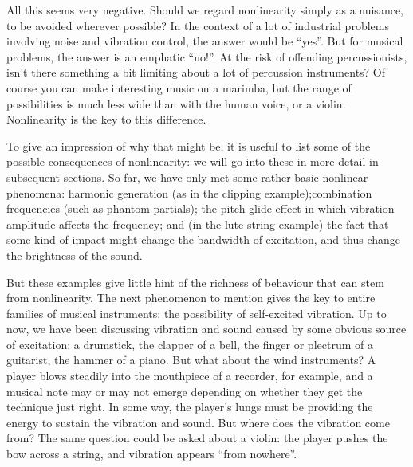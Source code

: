   All this seems very negative. Should we regard nonlinearity simply as a 
  nuisance, to be avoided wherever possible? In the context of a lot of 
  industrial problems involving noise and vibration control, the answer would 
  be “yes”. But for musical problems, the answer is an emphatic “no!”. At the 
  risk of offending percussionists, isn’t there something a bit limiting about 
  a lot of percussion instruments? Of course you can make interesting music on 
  a marimba, but the range of possibilities is much less wide than with the 
  human voice, or a violin. Nonlinearity is the key to this difference. 

  To give an impression of why that might be, it is useful to list some of the 
  possible consequences of nonlinearity: we will go into these in more detail 
  in subsequent sections. So far, we have only met some rather basic nonlinear 
  phenomena: harmonic generation (as in the clipping example);combination 
  frequencies (such as phantom partials); the pitch glide effect in which 
  vibration amplitude affects the frequency; and (in the lute string example) 
  the fact that some kind of impact might change the bandwidth of excitation, 
  and thus change the brightness of the sound. 

  But these examples give little hint of the richness of behaviour that can 
  stem from nonlinearity. The next phenomenon to mention gives the key to 
  entire families of musical instruments: the possibility of self-excited 
  vibration. Up to now, we have been discussing vibration and sound caused by 
  some obvious source of excitation: a drumstick, the clapper of a bell, the 
  finger or plectrum of a guitarist, the hammer of a piano. But what about the 
  wind instruments? A player blows steadily into the mouthpiece of a recorder, 
  for example, and a musical note may or may not emerge depending on whether 
  they get the technique just right. In some way, the player’s lungs must be 
  providing the energy to sustain the vibration and sound. But where does the 
  vibration come from? The same question could be asked about a violin: the 
  player pushes the bow across a string, and vibration appears “from nowhere”. 

